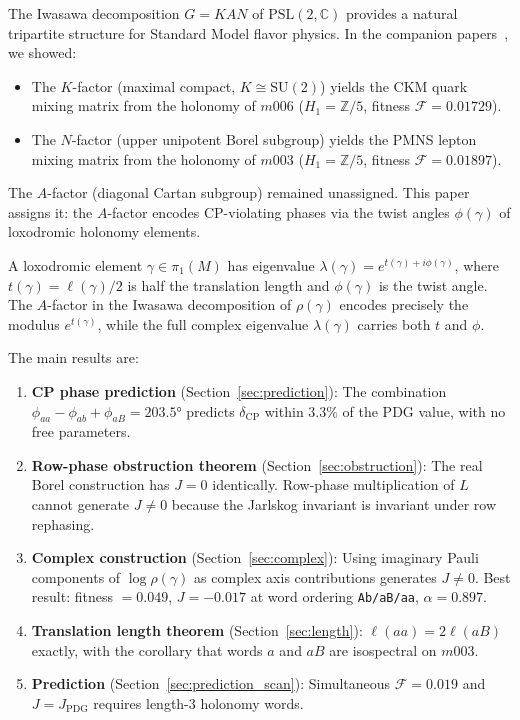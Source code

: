 \documentclass[floatfix,aps,prd,twocolumn,showpacs,superscriptaddress,longbibliography]{revtex4-2}
\newcommand{\PSL}{\mathrm{PSL}(2,\mathbb{C})}
\newcommand{\SUtwo}{\mathrm{SU}(2)}
\begin{document}
The Iwasawa decomposition $G = KAN$ of $\PSL$ provides a natural
tripartite structure for Standard Model flavor physics.
In the companion papers~\cite{Gentry:CKM,Gentry:PMNS}, we showed:
\begin{itemize}
\item The $K$-factor (maximal compact, $K \cong \SUtwo$) yields the
CKM quark mixing matrix from the holonomy of $m006$
($H_1 = \mathbb{Z}/5$, fitness $\mathcal{F} = 0.01729$).
\item The $N$-factor (upper unipotent Borel subgroup) yields the
PMNS lepton mixing matrix from the holonomy of $m003$
($H_1 = \mathbb{Z}/5$, fitness $\mathcal{F} = 0.01897$).
\end{itemize}
The $A$-factor (diagonal Cartan subgroup) remained unassigned.
This paper assigns it: the $A$-factor encodes CP-violating phases
via the twist angles $\phi(\gamma)$ of loxodromic holonomy elements.

A loxodromic element $\gamma \in \pi_1(M)$ has eigenvalue
$\lambda(\gamma) = e^{t(\gamma) + i\phi(\gamma)}$, where
$t(\gamma) = \ell(\gamma)/2$ is half the translation length and
$\phi(\gamma)$ is the twist angle. The $A$-factor in the Iwasawa
decomposition of $\rho(\gamma)$ encodes precisely the modulus
$e^{t(\gamma)}$, while the full complex eigenvalue
$\lambda(\gamma)$ carries both $t$ and $\phi$.

The main results are:
\begin{enumerate}
\item \textbf{CP phase prediction} (Section~\ref{sec:prediction}):
The combination $\phi_{aa} - \phi_{ab} + \phi_{aB} = 203.5°$
predicts $\delta_{\mathrm{CP}}$ within $3.3\%$ of the PDG value,
with no free parameters.

\item \textbf{Row-phase obstruction theorem}
(Section~\ref{sec:obstruction}):
The real Borel construction has $J = 0$ identically.
Row-phase multiplication of $L$ cannot generate $J \neq 0$
because the Jarlskog invariant is invariant under row rephasing.

\item \textbf{Complex construction}
(Section~\ref{sec:complex}):
Using imaginary Pauli components of $\log\rho(\gamma)$ as
complex axis contributions generates $J \neq 0$.
Best result: fitness $= 0.049$, $J = -0.017$ at word ordering
\texttt{Ab/aB/aa}, $\alpha = 0.897$.

\item \textbf{Translation length theorem}
(Section~\ref{sec:length}):
$\ell(aa) = 2\ell(aB)$ exactly, with the corollary that
words $a$ and $aB$ are isospectral on $m003$.

\item \textbf{Prediction}
(Section~\ref{sec:prediction_scan}):
Simultaneous $\mathcal{F} = 0.019$ and $J = J_{\mathrm{PDG}}$
requires length-3 holonomy words.
\end{enumerate}
\end{document}
